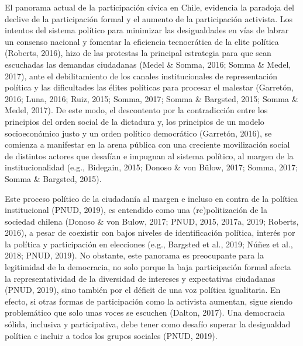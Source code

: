 \documentclass[12pt,twoside]{templates/facsothesis}
\begin{document}
El panorama actual de la participación cívica en Chile, evidencia la paradoja del declive de la participación formal y el aumento de la participación activista. Los intentos del sistema político para minimizar las desigualdades en vías de labrar un consenso nacional y fomentar la eficiencia tecnocrática de la elite política (Roberts, 2016), hizo de las protestas la principal estrategia para que sean escuchadas las demandas ciudadanas (Medel \& Somma, 2016; Somma \& Medel, 2017), ante el debilitamiento de los canales institucionales de representación política y las dificultades las élites políticas para procesar el malestar (Garretón, 2016; Luna, 2016; Ruiz, 2015; Somma, 2017; Somma \& Bargsted, 2015; Somma \& Medel, 2017). De este modo, el descontento por la contradicción entre los principios del orden social de la dictadura y, los principios de un modelo socioeconómico justo y un orden político democrático (Garretón, 2016), se comienza a manifestar en la arena pública con una creciente movilización social de distintos actores que desafían e impugnan al sistema político, al margen de la institucionalidad (e.g., Bidegain, 2015; Donoso \& von Bülow, 2017; Somma, 2017; Somma \& Bargsted, 2015).

Este proceso político de la ciudadanía al margen e incluso en contra de la política institucional (PNUD, 2019), es entendido como una (re)politización de la sociedad chilena (Donoso \& von Bulow, 2017; PNUD, 2015, 2017a, 2019; Roberts, 2016), a pesar de coexistir con bajos niveles de identificación política, interés por la política y participación en elecciones (e.g., Bargsted et al., 2019; Núñez et al., 2018; PNUD, 2019). No obstante, este panorama es preocupante para la legitimidad de la democracia, no solo porque la baja participación formal afecta la representatividad de la diversidad de intereses y expectativas ciudadanas (PNUD, 2019), sino también por el déficit de una voz política igualitaria. En efecto, si otras formas de participación como la activista aumentan, sigue siendo problemático que solo unas voces se escuchen (Dalton, 2017). Una democracia sólida, inclusiva y participativa, debe tener como desafío superar la desigualdad política e incluir a todos los grupos sociales (PNUD, 2019).
\end{document}
